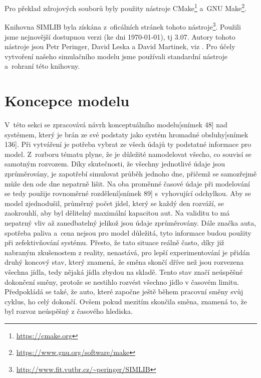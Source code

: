 \documentclass[a4paper, 11pt]{article}
\begin{document}
	Pro překlad zdrojových souborů byly použity nástroje
	CMake\footnote{\url{https://cmake.org}}
	a~GNU Make\footnote{\url{https://www.gnu.org/software/make}}.

	Knihovna SIMLIB byla získána z~oficálních stránek tohoto
	nástroje\footnote{\url{http://www.fit.vutbr.cz/~peringer/SIMLIB}}.
	Použili jsme nejnovější dostupnou verzi (ke dni \today), tj 3.07.
	Autory tohoto nástroje jsou Petr Peringer, David Leska a David Martinek,
	viz \cite{SIMLIB}. Pro účely vytvoření našeho simulačního modelu jsme
	používali standardní nástroje a~rohraní této knihovny.



	\section{Koncepce modelu}

	V~této sekci se zpracovává návrh konceptuálního modelu[snímek 48]\cite{IMS_slides} nad
	systémem, který je brán ze své podstaty jako systém hromadné obsluhy[snímek 136]\cite{IMS_slides}. Při vytváření
	je potřeba vybrat ze všech údajů ty podstatné informace pro model. Z~rozboru tématu 
	plyne, že je důležité namodelovat všecho, co souvisí se samotným rozvozem. Díky 
	skutečnosti, že všechny jednotlivé údaje jsou zprůměrovány, je zapotřebí simulovat průběh
	jednoho dne, přičemž se samozřejmě může den ode dne nepatrně lišit.	Na oba proměnné 
	časové údaje při modelování se tedy použije rovnoměrné rozdělení[snímek 89]\cite{IMS_slides}
	s~vyhovující odchylkou. Aby se model zjednodušil, průměrný počet jídel, který se 
	každý den rozváží, se zaokrouhlí, aby byl dělitelný maximální kapacitou aut. Na 
	validitu to má nepatrný	vliv až zanedbatelný jelikož jsou údaje zprůměrovány. Dále 
	značka auta, spotřeba paliva a~cena nejsou pro model důležitá, tyto informace budou 
	použity při	zefektivňování systému. Přesto, že tato situace reálně často, díky již 
	nabraným zkušenostem z reality, nenastává, pro lepší experimentování je přidán druhý 
	koncový stav, který znamená, že směna skončí dříve než jsou rozvezena všechna jídla, 
	tedy nějaká	jídla zbydou na skladě. Tento stav značí neúspěšné dokončení směny, protože 
	se nestihlo rozvést všechno jídlo v časovém limitu. Předpokládá se také, že auto, které 
	započne ještě během pracovní směny svůj cyklus, ho celý dokončí. Ovšem pokud mezitím 
	skončila směna, znamená to, že byl rozvoz neúspěšný z časového hlediska.
\end{document}
